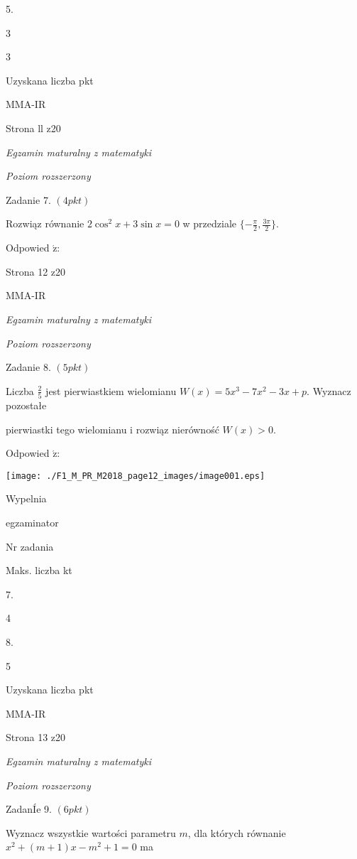 \documentclass[a4paper,12pt]{article}
\begin{document}
5.

3

3

Uzyskana liczba pkt

MMA-IR

Strona ll z20





{\it Egzamin maturalny z matematyki}

{\it Poziom rozszerzony}

Zadanie 7. $(4pkt)$

Rozwiąz równanie $2\cos^{2}x+3\sin x=0$ w przedziale $\displaystyle \{-\frac{\pi}{2},\frac{3\pi}{2}\}.$

Odpowied $\acute{\mathrm{z}}$:

Strona 12 z20

MMA-IR





{\it Egzamin maturalny z matematyki}

{\it Poziom rozszerzony}

Zadanie 8. $(5pkt)$

Liczba $\displaystyle \frac{2}{5}$ jest pierwiastkiem wielomianu $W(x)=5x^{3}-7x^{2}-3x+p$. Wyznacz pozostałe

pierwiastki tego wielomianu i rozwiąz nierówność $W(x)>0.$

Odpowied $\acute{\mathrm{z}}$:
\begin{center}
\texttt{[image: ./F1\_M\_PR\_M2018\_page12\_images/image001.eps]}
\end{center}
Wypelnia

egzaminator

Nr zadania

Maks. liczba kt

7.

4

8.

5

Uzyskana liczba pkt

MMA-IR

Strona 13 z20





{\it Egzamin maturalny z matematyki}

{\it Poziom rozszerzony}

ZadanÍe 9. $(6pkt)$

Wyznacz wszystkie wartości parametru $m$, dla których równanie $x^{2}+(m+1)x-m^{2}+1=0$ ma
\end{document}
